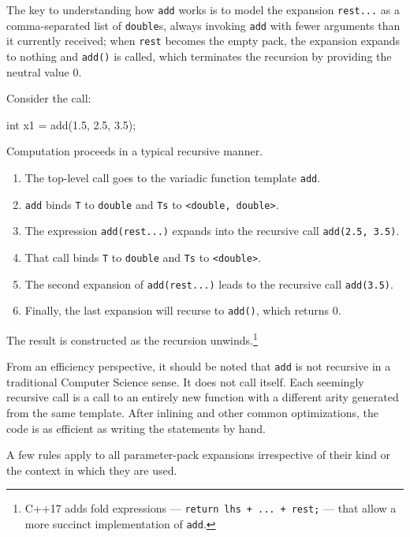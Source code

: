 \noindent The key to understanding how \lstinline!add! works is to model the
expansion \lstinline!rest...! as a comma-separated list of
\lstinline!double!s, always invoking \lstinline!add! with fewer arguments than
it currently received; when \lstinline!rest! becomes the empty pack, the
expansion expands to nothing and \lstinline!add()! is called, which
terminates the recursion by providing the neutral value 0.

Consider the call:

\begin{emcppslisting}
int x1 = add(1.5, 2.5, 3.5);
\end{emcppslisting}
    

\noindent Computation proceeds in a typical recursive manner.
\begin{enumerate}
\item{The top-level call goes to the variadic function template \lstinline!add!.}
\item{\lstinline!add! binds \lstinline!T! to \lstinline!double! and \lstinline!Ts! to \lstinline!<double,!~\lstinline!double>!.}
\item{The expression \lstinline!add(rest...)! expands into the recursive call \lstinline!add(2.5,!~\lstinline!3.5)!.}
\item{That call binds \lstinline!T! to \lstinline!double! and \lstinline!Ts! to \lstinline!<double>!.}
\item{The second expansion of \lstinline!add(rest...)! leads to the recursive call \lstinline!add(3.5)!.}
\item{Finally, the last expansion will recurse to \lstinline!add()!, which returns 0.}
\end{enumerate}
The result is constructed as the recursion
unwinds.{\cprotect\footnote{C++17 adds fold expressions ---
\lstinline!return!~\lstinline!lhs!~\lstinline!+!~\lstinline!...!~\lstinline!+!~\lstinline!rest;!
  --- that allow a more succinct implementation of \lstinline!add!.}}

From an efficiency perspective, it should be noted that \lstinline!add! is
not recursive in a traditional Computer Science sense. It does not call
itself. Each seemingly recursive call is a call to an entirely new
function with a different arity generated from the same template. After
inlining and other common optimizations, the code is as efficient as
writing the statements by hand.

A few rules apply to all parameter-pack expansions irrespective of their
kind or the context in which they are used.

